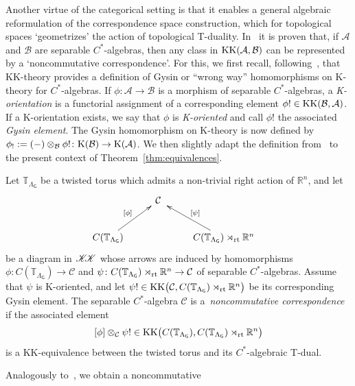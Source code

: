 \documentclass[pdftex]{sigma}
\numberwithin{equation}{section}
\newcommand{\CCK}{\mathscr{K}}
\newcommand{\Ccal}{\mathcal{C}}
\newcommand{\sfG}{\mathsf{G}}
\newcommand{\rt}{{\rm rt}}
\newcommand{\real}{{\mathbb R}} %
\newcommand{\torus}{{\mathbb T}} %
\def\alg{{\mathcal A}}
\def\balg{{\mathcal B}}
\begin{document}
Another virtue of the categorical setting is that it enables a
general algebraic reformulation of the correspondence space
construction, which for topological spaces `geometrizes' the action of
topological T-duality. In~\cite[Proposition~5.3]{Brodzki2007} it is proven that, if
$\alg$ and $\balg$ are separable $C^*$-algebras, then any class in
${\rm KK}(\alg,\balg)$ can be represented by a `noncommutative
correspondence'. For this, we first recall,
 following~\cite{Brodzki2006,Brodzki2007}, that KK-theory provides a
definition of Gysin or ``wrong way'' homomorphisms on K-theory for
$C^*$-algebras. If $\phi:\alg\to\balg$ is a
morphism of separable $C^*$-algebras, a \emph{K-orientation} is a
functorial assignment of a corresponding element $\phi!\in{\rm
 KK}(\balg,\alg)$. If a K-orientation exists, we say that $\phi$ is
\emph{K-oriented} and call $\phi!$ the associated \emph{Gysin
 element}. The Gysin
homomorphism on K-theory is now defined by $\phi_!:=(-)\otimes_\balg\phi!\colon {\rm
 K}(\balg)\to{\rm K}(\alg)$. We then slightly adapt
the definition from~\cite{Brodzki2007} to the present context of Theorem~\ref{thm:equivalences}.
\begin{Definition}
\label{def:NCcorr}
Let $\torus_{\Lambda_\sfG}$ be a twisted torus which admits a
non-trivial right action
of $\real^n$, and let
\begin{gather}\label{eq:NCcorrdiag}\begin{split}&
\xymatrix{
 & \ \Ccal \ & \\
C(\torus_{\Lambda_\sfG}) \ar[ur]^{[\phi]} & &
C(\torus_{\Lambda_\sfG})\rtimes_\rt\real^n
\ar[ul]_{[\psi]}
}\end{split}
\end{gather}
be a diagram in $\CCK\hspace{-1mm}\CCK$ whose arrows are induced by
homomorphisms $\phi\colon C(\torus_{\Lambda_\sfG})\to\Ccal$ and
$\psi\colon C(\torus_{\Lambda_\sfG})\rtimes_\rt\real^n\to\Ccal$ of separable
$C^*$-algebras. Assume that $\psi$ is K-oriented, and let $\psi!\in{\rm KK}\big(\Ccal,C(\torus_{\Lambda_\sfG})
\rtimes_\rt\real^n\big)$ be its corresponding Gysin element. The separable $C^*$-algebra $\Ccal$
is a~\emph{noncommutative correspondence} if the associated element
\[
[\phi]\otimes_\Ccal \psi! \in {\rm KK}\big(C(\torus_{\Lambda_\sfG}) ,
C(\torus_{\Lambda_\sfG}) \rtimes_\rt\real^n\big)
\]
is a KK-equivalence between the twisted torus and its
$C^*$-algebraic T-dual.
\end{Definition}Analogously to~\cite{Bouwknegt2008}, we obtain a noncommutative
\end{document}
